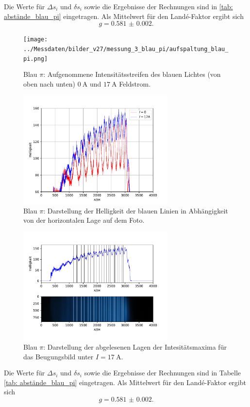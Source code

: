 Die Werte für $\Delta s_i$ und $\delta s_i$ sowie die Ergebnisse der Rechnungen sind in \autoref{tab: abstände_blau_pi} eingetragen.
Als Mittelwert für den Landé-Faktor ergibt sich
\begin{equation}
  g = \num{0.581(2)}.
\end{equation}
\begin{figure}
  \centering
  \texttt{[image: ../Messdaten/bilder\_v27/messung\_3\_blau\_pi/aufspaltung\_blau\_pi.png]}
  \caption{Blau $\pi$: Aufgenommene Intensitätsstreifen des blauen Lichtes (von oben nach unten) $\SI{0}{\ampere}$ und $\SI{17}{\ampere}$ Feldstrom.}
  \label{fig: aufspaltung_blau_pi}
\end{figure}
\begin{figure}
  \centering
  \includegraphics[width = 0.7\textwidth]{../Messdaten/plots/blau_pi_intensitaet.pdf}
  \caption{Blau $\pi$: Darstellung der Helligkeit der blauen Linien in Abhängigkeit von der horizontalen Lage auf dem Foto.}
  \label{fig: blau_intensität_pi}
\end{figure}

\begin{figure}
  \centering
  \includegraphics[width = 0.7\textwidth]{../Messdaten/plots/peaks_blau_pi_17.pdf}
  \caption{Blau $\pi$: Darstellung der abgelesenen Lagen der Intesitätsmaxima für das Beugungsbild unter $I =\SI{17}{\ampere}$.}
  \label{fig: peaks_blau_pi_17}
\end{figure}

Die Werte für $\Delta s_i$ und $\delta s_i$ sowie die Ergebnisse der Rechnungen sind in Tabelle \ref{tab: abstände_blau_pi} eingetragen.
Als Mittelwert für den Landé-Faktor ergibt sich
\begin{equation}
  g = \num{0.581(2)}.
\end{equation}
